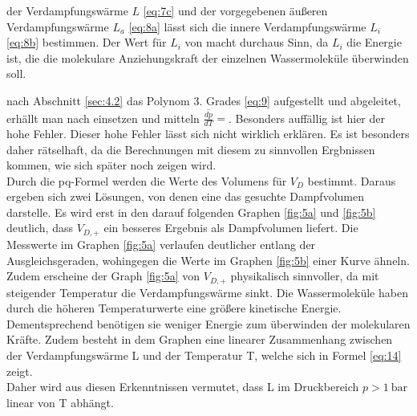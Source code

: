 \justifying der Verdampfungswärme $L$ \eqref{eq:7c} und der vorgegebenen äußeren Verdampfungswärme $L_a$ \eqref{eq:8a} lässt
sich die innere Verdampfungswärme $L_i$ \eqref{eq:8b} bestimmen. Der Wert für $L_i$ von  macht durchaus Sinn, da $L_i$ die Energie ist,
die die molekulare Anziehungskraft der einzelnen Wassermoleküle überwinden soll. 

\justifying nach Abschnitt \ref{sec:4.2} das Polynom 3. Grades \eqref{eq:9} aufgestellt und abgeleitet, erhällt man nach einsetzen und mitteln    
$\overline{\frac{dp}{dT}} = \text{}$\!. Besonders auffällig ist hier der hohe Fehler.
Dieser hohe Fehler lässt sich nicht wirklich erklären. Es ist besonders daher rätselhaft, da die Berechnungen
mit diesem zu sinnvollen Ergbnissen kommen, wie sich später noch zeigen wird. \\
Durch die pq-Formel werden die Werte des Volumens für $V_D$ bestimmt. Daraus ergeben sich zwei Lösungen,
von denen eine das gesuchte Dampfvolumen darstelle. 
Es wird erst in den darauf folgenden Graphen \ref{fig:5a} und \ref{fig:5b} deutlich, dass $V_{D,+}$ ein 
besseres Ergebnis als Dampfvolumen liefert. Die Messwerte im Graphen \ref{fig:5a} verlaufen deutlicher entlang der Ausgleichsgeraden, wohingegen die Werte im Graphen
\ref{fig:5b} einer Kurve ähneln. Zudem erscheine der Graph \ref{fig:5a} von $V_{D,+}$ physikalisch sinnvoller, da mit steigender
Temperatur die Verdampfungswärme sinkt. Die Wassermoleküle haben durch die höheren Temperaturwerte
eine größere kinetische Energie. Dementsprechend benötigen sie weniger Energie zum überwinden
der molekularen Kräfte. Zudem besteht in dem Graphen eine linearer Zusammenhang zwischen der 
Verdampfungswärme L und der Temperatur T, welche sich in Formel \eqref{eq:14} zeigt.\\
Daher wird aus diesen Erkenntnissen vermutet, dass L im Druckbereich $p>\SI{1}{\bar} $ linear von T abhängt.



\newpage
\printbibliography


